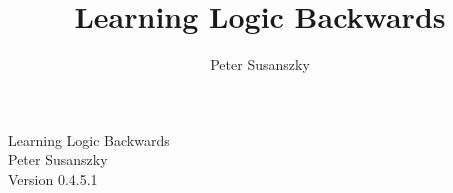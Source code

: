 \documentclass[12pt]{book}
\author{Peter Susanszky}
\title{Learning Logic Backwards}
\date{}
\begin{document}
\setcounter{page}{0}


\frontmatter

\noindent
Learning Logic Backwards\\
Peter Susanszky\\
Version 0.4.5.1
\doclicenseThis

\tableofcontents

\mainmatter








\end{document}
